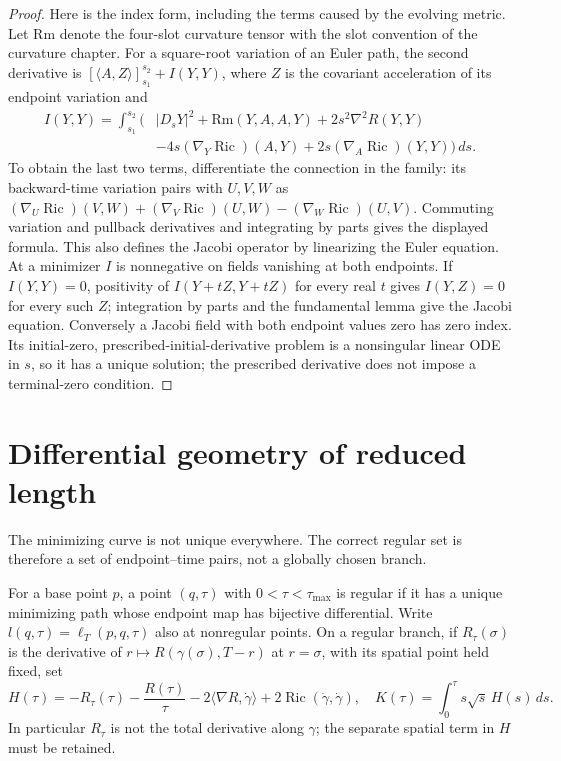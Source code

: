 \begin{proof}
Here is the index form, including the terms caused by the evolving metric.
Let $\mathrm{Rm}$ denote the four-slot curvature tensor with the slot convention
of the curvature chapter.  For a square-root variation of an Euler path,
the second derivative is $[\langle A,Z\rangle]_{s_1}^{s_2}+I(Y,Y)$,
where $Z$ is the covariant acceleration of its endpoint variation and
\begin{align*}
 I(Y,Y)=\int_{s_1}^{s_2}\bigl(&|D_sY|^2+\mathrm{Rm}(Y,A,A,Y)
       +2s^2\nabla^2R(Y,Y)\\
       &-4s(\nabla_Y\operatorname{Ric})(A,Y)
             +2s(\nabla_A\operatorname{Ric})(Y,Y)\bigr)\,ds.
\end{align*}
To obtain the last two terms, differentiate the connection in the family:
its backward-time variation pairs with $U,V,W$ as
$(\nabla_U\operatorname{Ric})(V,W)+
 (\nabla_V\operatorname{Ric})(U,W)-
 (\nabla_W\operatorname{Ric})(U,V)$.  Commuting variation and pullback
derivatives and integrating by parts gives the displayed formula.
This also defines the Jacobi operator by linearizing the Euler equation.
At a minimizer $I$ is nonnegative on fields vanishing at both endpoints.
If $I(Y,Y)=0$, positivity of $I(Y+tZ,Y+tZ)$ for every real $t$ gives
$I(Y,Z)=0$ for every such $Z$; integration by parts and the fundamental
lemma give the Jacobi equation.  Conversely a Jacobi field with both endpoint
values zero has zero index.  Its initial-zero, prescribed-initial-derivative
problem is a nonsingular linear ODE in $s$, so it has a unique solution;
the prescribed derivative does not impose a terminal-zero condition.
\end{proof}

\section{Differential geometry of reduced length}

The minimizing curve is not unique everywhere.  The correct regular set is
therefore a set of endpoint--time pairs, not a globally chosen branch.

\begin{definition}
\label{def:reduced-regular-branch}
For a base point $p$, a point $(q,\tau)$ with $0<\tau<\tau_{\max}$ is regular
if it has a unique minimizing path whose endpoint map has bijective
differential.  Write $l(q,\tau)=\ell_T(p,q,\tau)$ also at nonregular points.
On a regular branch, if
$R_\tau(\sigma)$ is the derivative of
$r\mapsto R(\gamma(\sigma),T-r)$ at $r=\sigma$, with its spatial point
held fixed, set
\[
 H(\tau)=-R_\tau(\tau)-\frac{R(\tau)}\tau
 -2\langle\nabla R,\dot\gamma\rangle+2\operatorname{Ric}(\dot\gamma,\dot\gamma),
 \quad K(\tau)=\int_0^\tau s\sqrt{s}\,H(s)\,ds .
\]
In particular $R_\tau$ is not the total derivative along $\gamma$;
the separate spatial term in $H$ must be retained.
\end{definition}

